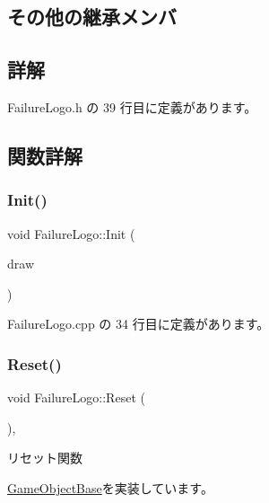 \subsection*{その他の継承メンバ}


\subsection{詳解}


 Failure\+Logo.\+h の 39 行目に定義があります。



\subsection{関数詳解}
\mbox{\label{class_failure_logo_a22da89def55023f43860cf646da7a74c}} 
\subsubsection{\texorpdfstring{Init()}{Init()}}
{\footnotesize\ttfamily void Failure\+Logo\+::\+Init (\begin{DoxyParamCaption}\item[{\mbox{\hyperlink{class_draw_base}{Draw\+Base}} $\ast$}]{draw }\end{DoxyParamCaption})}



 Failure\+Logo.\+cpp の 34 行目に定義があります。

\mbox{\label{class_failure_logo_a542b1617087a6701f7edb345e2a72e01}} 
\subsubsection{\texorpdfstring{Reset()}{Reset()}}
{\footnotesize\ttfamily void Failure\+Logo\+::\+Reset (\begin{DoxyParamCaption}{ }\end{DoxyParamCaption})\hspace{0.3cm}{\ttfamily [override]}, {\ttfamily [virtual]}}



リセット関数 



\mbox{\hyperlink{class_game_object_base_a85c59554f734bcb09f1a1e18d9517dce}{Game\+Object\+Base}}を実装しています。



